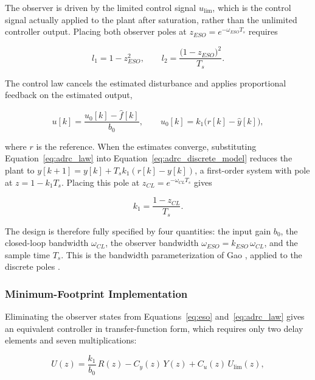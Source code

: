 The observer is driven by the limited control signal $u_{\mathrm{lim}}$, which is the control signal actually applied to the plant after saturation, rather than the unlimited controller output. Placing both observer poles at $z_{ESO} = e^{-\omega_{ESO} T_s}$ requires

\begin{equation}
	l_1 = 1 - z_{ESO}^{2},
	\qquad
	l_2 = \frac{\big( 1 - z_{ESO} \big)^{2}}{T_s}.
	\label{eq:eso_gains}
\end{equation}

The control law cancels the estimated disturbance and applies proportional feedback on the estimated output,

\begin{equation}
	u[k] = \frac{u_0[k] - \hat{f}[k]}{b_0},
	\qquad
	u_0[k] = k_1 \big( r[k] - \hat{y}[k] \big),
	\label{eq:adrc_law}
\end{equation}

where $r$ is the reference. When the estimates converge, substituting Equation~\eqref{eq:adrc_law} into Equation~\eqref{eq:adrc_discrete_model} reduces the plant to $y[k+1] = y[k] + T_s k_1 (r[k] - y[k])$, a first-order system with pole at $z = 1 - k_1 T_s$. Placing this pole at
$z_{CL} = e^{-\omega_{CL} T_s}$ gives

\begin{equation}
	k_1 = \frac{1 - z_{CL}}{T_s}.
	\label{eq:k1}
\end{equation}

The design is therefore fully specified by four quantities: the input gain $b_0$, the closed-loop bandwidth $\omega_{CL}$, the observer bandwidth $\omega_{ESO} = k_{ESO}\,\omega_{CL}$, and the sample time $T_s$. This is the bandwidth parameterization of Gao \cite{gao_scaling_2003}, applied to the discrete poles \cite{herbst_tuning_2023}.

\subsubsection{Minimum-Footprint Implementation}

Eliminating the observer states from Equations~\eqref{eq:eso}
and~\eqref{eq:adrc_law} gives an equivalent controller in transfer-function
form, which requires only two delay elements and seven multiplications:

\begin{equation}
	U(z) = \frac{k_1}{b_0}\, R(z) - C_y(z)\, Y(z) + C_u(z)\, U_{\mathrm{lim}}(z),
	\label{eq:mfp_tf}
\end{equation}

